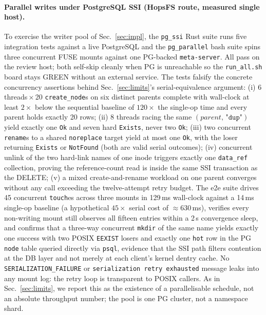 \documentclass[numberedsection,acmtos]{acmart}
\begin{document}
\paragraph{Parallel writes under PostgreSQL SSI (HopsFS route, measured single
host).} To exercise the writer pool of Sec.~\ref{sec:impl}, the \texttt{pg\_ssi}
Rust suite runs five integration tests against a live PostgreSQL and the
\texttt{pg\_parallel} bash suite spins three concurrent FUSE mounts against one
PG-backed \texttt{meta-server}. All pass on the review host; both self-skip
cleanly when PG is unreachable so the \texttt{run\_all.sh} board stays GREEN
without an external service. The tests falsify the concrete
concurrency assertions behind Sec.~\ref{sec:limits}'s serial-equivalence
argument: (i) 6 threads\,$\times$\,20 \texttt{create\_node}s on six distinct
parents complete with wall-clock at least $2\times$ below the sequential
baseline of $120\times$ the single-op time and every parent holds exactly 20
rows; (ii) 8 threads racing the same $(\mathit{parent},\,\texttt{"dup"})$
yield exactly one \texttt{Ok} and seven hard \texttt{Exists}, never two \texttt{Ok};
(iii) two concurrent \texttt{rename}s to a shared \texttt{noreplace} target yield
at most one \texttt{Ok}, with the loser returning \texttt{Exists} or
\texttt{NotFound} (both are valid serial outcomes); (iv) concurrent unlink of
the two hard-link names of one inode triggers exactly one \texttt{data\_ref}
collection, proving the reference-count read is inside the same SSI
transaction as the DELETE; (v) a mixed create-and-rename workload on one parent
converges without any call exceeding the twelve-attempt retry budget. The e2e
suite drives 45 concurrent \texttt{touch}es across three mounts in 129\,ms
wall-clock against a 14\,ms single-op baseline (a hypothetical $45\times$ serial
cost of $\approx$630\,ms), verifies
every non-writing mount still observes all fifteen entries within a 2\,s
convergence sleep, and confirms that a three-way concurrent
\texttt{mkdir} of the same name yields exactly one success with two POSIX
\texttt{EEXIST} losers and exactly one \texttt{hot} row in the PG
\texttt{node} table queried directly via \texttt{psql}, evidence that the SSI
path filters contention at the DB layer and not merely at each client's kernel
dentry cache. No \texttt{SERIALIZATION\_FAILURE}
or \texttt{serialization retry exhausted} message leaks into any mount log:
the retry loop is transparent to POSIX callers. As in Sec.~\ref{sec:limits},
we report this as the existence of a parallelisable schedule, not an
absolute throughput number; the pool is one PG cluster, not a namespace shard.
\end{document}
